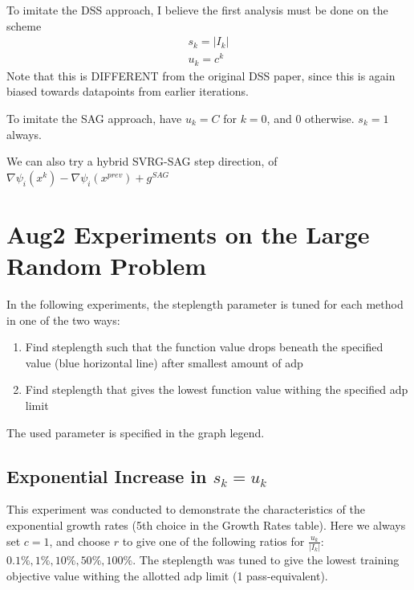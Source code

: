 \documentclass[12pt]{article}
\begin{document}
	To imitate the DSS approach, I believe the first analysis must be done on the scheme
	\begin{align*}
		s_k=|I_k| \\
		u_k=c^k
	\end{align*}
	Note that this is DIFFERENT from the original DSS paper, since this is again biased towards datapoints from earlier iterations. 
	
	To imitate the SAG approach, have $u_k=C$ for $k=0$, and $0$ otherwise. $s_k=1$ always. 
	
	We can also try a hybrid SVRG-SAG  step direction, of $\nabla \psi_i (x^k) - \nabla \psi_i (x^{prev}) + g^{SAG}$
	
	\newpage 
	\section{Aug2 Experiments on the Large Random Problem}
	In the following experiments, the steplength parameter is tuned for each method in one of the two ways:
	\begin{enumerate}
		\item Find steplength such that the function value drops beneath the specified value (blue horizontal line) after smallest amount of adp
		\item Find steplength that gives the lowest function value withing the specified adp limit
	\end{enumerate}
	The used parameter is specified in the graph legend.
	
	\newpage
	
	\subsection{Exponential Increase in $s_k=u_k$}
	
	This experiment was conducted to demonstrate the characteristics of the exponential growth rates (5th choice in the Growth Rates table). Here we always set $c=1$, and choose $r$ to give one of the following ratios for $\frac{u_k}{|I_k|}$: $0.1\%, 1\%, 10\%, 50\%, 100\%$. The steplength was tuned to give the lowest training objective value withing the allotted adp limit (1 pass-equivalent).
	
\end{document}
